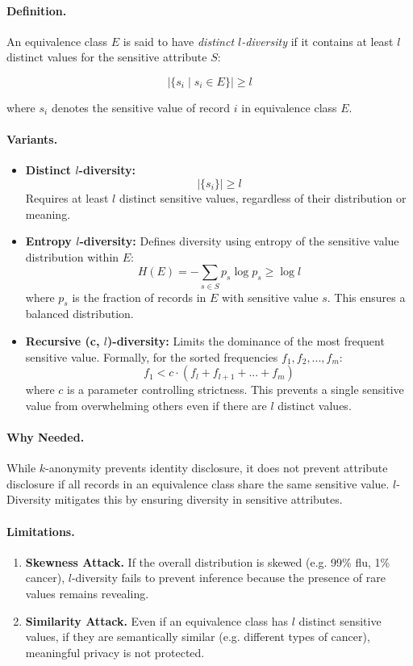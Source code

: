 \documentclass{article}
\begin{document}
\paragraph{ Definition.}
An equivalence class $E$ is said to have \textit{distinct $l$-diversity} if it contains at least $l$ distinct values for the sensitive attribute $S$:

\[
|\{ s_i \mid s_i \in E \}| \geq l
\]

where $s_i$ denotes the sensitive value of record $i$ in equivalence class $E$.

\paragraph{Variants.}
\begin{itemize}
    \item \textbf{Distinct $l$-diversity:}
    \[
    |\{ s_i \}| \geq l
    \]
    Requires at least $l$ distinct sensitive values, regardless of their distribution or meaning.

    \item \textbf{Entropy $l$-diversity:}
    Defines diversity using entropy of the sensitive value distribution within $E$:
    \[
    H(E) = - \sum_{s \in S} p_s \log p_s \geq \log l
    \]
    where $p_s$ is the fraction of records in $E$ with sensitive value $s$. This ensures a balanced distribution.

    \item \textbf{Recursive (c, $l$)-diversity:}
    Limits the dominance of the most frequent sensitive value. Formally, for the sorted frequencies $f_1, f_2, ..., f_m$:
    \[
    f_1 < c \cdot (f_l + f_{l+1} + ... + f_m)
    \]
    where $c$ is a parameter controlling strictness. This prevents a single sensitive value from overwhelming others even if there are $l$ distinct values.
\end{itemize}

\paragraph{Why Needed.}
While $k$-anonymity prevents identity disclosure, it does not prevent attribute disclosure if all records in an equivalence class share the same sensitive value. $l$-Diversity mitigates this by ensuring diversity in sensitive attributes.

\paragraph{Limitations.}
\begin{enumerate}
    \item \textbf{Skewness Attack.} If the overall distribution is skewed (e.g. 99\% flu, 1\% cancer), $l$-diversity fails to prevent inference because the presence of rare values remains revealing.

    \item \textbf{Similarity Attack.} Even if an equivalence class has $l$ distinct sensitive values, if they are semantically similar (e.g. different types of cancer), meaningful privacy is not protected.
\end{enumerate}
\end{document}
